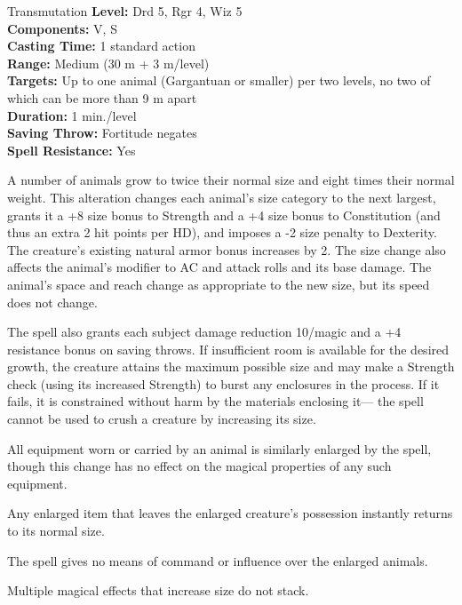 {Transmutation}
{
	\textbf{Level:}
	Drd 5, Rgr 4, Wiz 5\\
	\textbf{Components:}
	V, S\\
	\textbf{Casting Time:}
	1 standard action\\
	\textbf{Range:}
	Medium (30 m + 3 m/level)\\
	\textbf{Targets:}
	Up to one animal (Gargantuan or smaller) per two levels, no two of which can be more than 9 m apart\\
	\textbf{Duration:}
	1 min./level\\
	\textbf{Saving Throw:}
	Fortitude negates\\
	\textbf{Spell Resistance:}
	Yes\\
}
{
	A number of animals grow to twice their normal size and eight times their normal weight. This alteration changes each animal's size category to the next largest, grants it a +8 size bonus to Strength and a +4 size bonus to Constitution (and thus an extra 2 hit points per HD), and imposes a -2 size penalty to Dexterity. The creature's existing natural armor bonus increases by 2. The size change also affects the animal's modifier to AC and attack rolls and its base damage. The animal's space and reach change as appropriate to the new size, but its speed does not change.

	The spell also grants each subject damage reduction 10/magic and a +4 resistance bonus on saving throws. If insufficient room is available for the desired growth, the creature attains the maximum possible size and may make a Strength check (using its increased Strength) to burst any enclosures in the process. If it fails, it is constrained without harm by the materials enclosing it--- the spell cannot be used to crush a creature by increasing its size.

	All equipment worn or carried by an animal is similarly enlarged by the spell, though this change has no effect on the magical properties of any such equipment.

	Any enlarged item that leaves the enlarged creature's possession instantly returns to its normal size.

	The spell gives no means of command or influence over the enlarged animals.

	Multiple magical effects that increase size do not stack.

}
